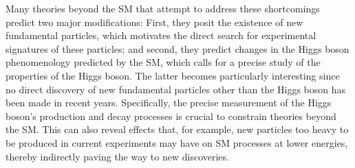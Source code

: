 Many theories beyond the SM that attempt to address these shortcomings predict two major modifications: First, they posit the existence of new fundamental particles, which motivates the direct search for experimental signatures of these particles; and second, they predict changes in the Higgs boson phenomenology predicted by the SM, which calls for a precise study of the properties of the Higgs boson. 
The latter becomes particularly interesting since no direct discovery of new fundamental particles other than the Higgs boson has been made in recent years. 
Specifically, the precise measurement of the Higgs boson's production and decay processes is crucial to constrain theories beyond the SM. 
This can also reveal effects that, for example, new particles too heavy to be produced in current experiments may have on SM processes at lower energies, thereby indirectly paving the way to new discoveries. 


